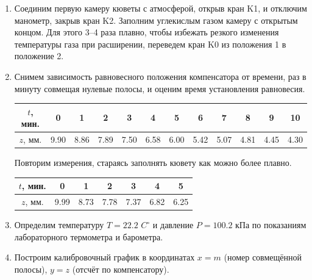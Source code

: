 \documentclass[a4paper, 12pt]{article}
\begin{document}
\begin{enumerate}
    \item Соединим первую камеру кюветы с атмосферой, открыв кран K1, и отключим манометр, закрыв кран K2. Заполним углекислым газом камеру с открытым
    концом. Для этого 3–4 раза плавно, чтобы избежать резкого изменения температуры газа при расширении, переведем кран K0 из положения 1 в положение 2.
    \item Снимем зависимость равновесного положения компенсатора от времени, раз в минуту совмещая нулевые полосы, и оценим время установления равновесия.
    
    \begin{tabular}{|c|c|c|c|c|c|c|c|c|c|c|c|} \hline
        $t$, мин. & 0 & 1 & 2 & 3 & 4 & 5 & 6 & 7 & 8 & 9 & 10 \\ \hline
        $z$, мм. & 9.90 & 8.86 & 7.89 & 7.50 & 6.58 & 6.00 & 5.42 & 5.07 & 4.81 & 4.45 & 4.30 \\ \hline
    \end{tabular}

    Повторим измерения, стараясь заполнять кювету как можно более плавно.

    \begin{tabular}{|c|c|c|c|c|c|c|} \hline
        $t$, мин. & 0 & 1 & 2 & 3 & 4 & 5 \\ \hline
        $z$, мм. & 9.99 & 8.73 & 7.78 & 7.37 & 6.82 & 6.25 \\ \hline
    \end{tabular}

    \item Определим температуру $T = 22.2$ $C^{\circ}$ и давление $P = 100.2$ кПа по показаниям лабораторного термометра и барометра.
    \item Построим калибровочный график в координатах $x = m$ (номер совмещённой полосы), $y = z$ (отсчёт по компенсатору).
    

\end{enumerate}
\end{document}
